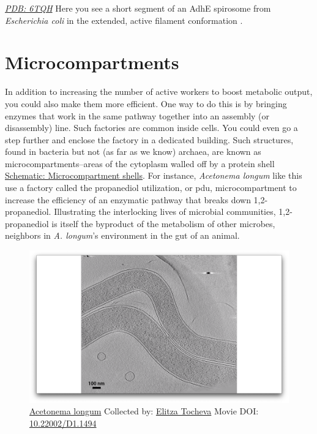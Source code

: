 \documentclass[]{tufte-book}
\begin{document}
\href{http://rcsb.org/structure/6TQH}{\emph{PDB: 6TQH}} Here you see a
short segment of an AdhE spirosome from \emph{Escherichia coli} in the
extended, active filament conformation \citep{pony2020}.

\section{Microcompartments}\label{microcompartments}

In addition to increasing the number of active workers to boost
metabolic output, you could also make them more efficient. One way to do
this is by bringing enzymes that work in the same pathway together into
an assembly (or disassembly) line. Such factories are common inside
cells. You could even go a step further and enclose the factory in a
dedicated building. Such structures, found in bacteria but not (as far
as we know) archaea, are known as microcompartments--areas of the
cytoplasm walled off by a protein shell
\protect\hyperlink{Microcompartment_shells}{Schematic: Microcompartment
shells}. For instance, \emph{Acetonema longum} like this use a factory
called the propanediol utilization, or pdu, microcompartment to increase
the efficiency of an enzymatic pathway that breaks down 1,2-propanediol.
Illustrating the interlocking lives of microbial communities,
1,2-propanediol is itself the byproduct of the metabolism of other
microbes, neighbors in \emph{A. longum}'s environment in the gut of an
animal.





\begin{figure}
\includegraphics{movie_stills/4_6} \caption[\protect\hyperlink{tree}{Acetonema longum} Collected by:
\protect\hyperlink{elitza_tocheva}{Elitza Tocheva} Movie DOI:
\href{https://doi.org/10.22002/D1.1494}{10.22002/D1.1494}]{\protect\hyperlink{tree}{Acetonema longum} Collected by:
\protect\hyperlink{elitza_tocheva}{Elitza Tocheva} Movie DOI:
\href{https://doi.org/10.22002/D1.1494}{10.22002/D1.1494}}\label{fig:4-6}
\end{figure}
\end{document}
